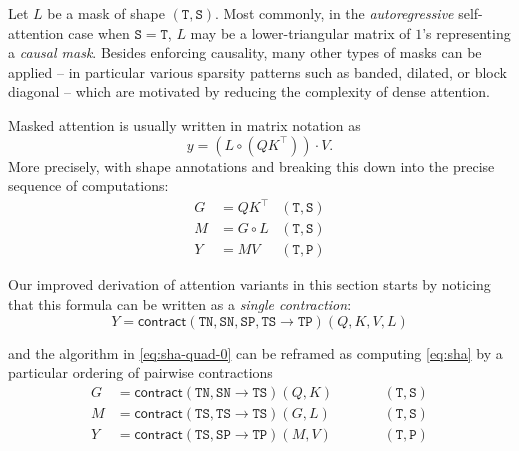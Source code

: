 %

Let $L$ be a mask of shape $\mathtt{(T,S)}$.
Most commonly, in the \emph{autoregressive} self-attention case when $\mathtt{S}=\mathtt{T}$,
$L$ may be a lower-triangular matrix of $1$'s representing a \emph{causal mask}.
Besides enforcing causality, many other types of masks can be applied -- in particular various sparsity patterns such as banded, dilated, or block diagonal -- which are motivated by reducing the complexity of dense attention. %

Masked attention is usually written in matrix notation as
\begin{equation}%
  \label{eq:sha-quad-matrix}
  y = (L \circ (QK^\top)) \cdot V
  .
\end{equation}
More precisely, with shape annotations and breaking this down into the precise sequence of computations:
\begin{equation}
  \label{eq:sha-quad-0}
  \begin{aligned}%
    G &= QK^\top & \mathtt{(T,S)} \\
    M &= G \circ L & \mathtt{(T,S)} \\
    Y &= M V & \mathtt{(T,P)}
  \end{aligned}
\end{equation}

Our improved derivation of attention variants in this section starts by noticing that this formula can be written as a \emph{single contraction}:
\begin{equation}
  \label{eq:sha}
  Y = \mathsf{contract}(\mathtt{TN},\mathtt{SN},\mathtt{SP},\mathtt{TS} \to \mathtt{TP})(Q, K, V, L)
\end{equation}

and the algorithm in \eqref{eq:sha-quad-0} can be reframed as computing \eqref{eq:sha} by a particular ordering of pairwise contractions
\begin{subequations}
  \label{eq:sha-quad}
  \begin{align}%
    \label{eq:sha-quad:1}
    G &= \mathsf{contract}(\mathtt{TN, SN} \to \mathtt{TS})(Q, K) && \qquad \mathtt{(T,S)} \\
    \label{eq:sha-quad:2}
    M &= \mathsf{contract}(\mathtt{TS, TS} \to \mathtt{TS})(G, L) && \qquad \mathtt{(T,S)} \\
    \label{eq:sha-quad:3}
    Y &= \mathsf{contract}(\mathtt{TS, SP} \to \mathtt{TP})(M, V) && \qquad \mathtt{(T,P)}
  \end{align}
\end{subequations}

